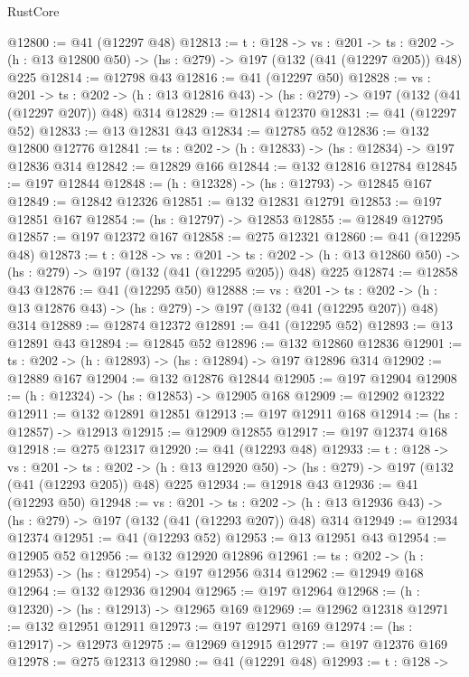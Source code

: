 \begin{lexlean}{RustCore}
\begin{coremodule}
@12800 := @41 (@12297 @48)
@12813 := {t : @128} ->
  {vs : @201} ->
  {ts : @202} -> (h : @13 @12800 @50) -> (hs : @279) -> @197 (@132 (@41 (@12297 @205)) @48) @225
@12814 := @12798 @43
@12816 := @41 (@12297 @50)
@12828 := {vs : @201} ->
  {ts : @202} -> (h : @13 @12816 @43) -> (hs : @279) -> @197 (@132 (@41 (@12297 @207)) @48) @314
@12829 := @12814 @12370
@12831 := @41 (@12297 @52)
@12833 := @13 @12831 @43
@12834 := @12785 @52
@12836 := @132 @12800 @12776
@12841 := {ts : @202} -> (h : @12833) -> (hs : @12834) -> @197 @12836 @314
@12842 := @12829 @166
@12844 := @132 @12816 @12784
@12845 := @197 @12844
@12848 := (h : @12328) -> (hs : @12793) -> @12845 @167
@12849 := @12842 @12326
@12851 := @132 @12831 @12791
@12853 := @197 @12851 @167
@12854 := (hs : @12797) -> @12853
@12855 := @12849 @12795
@12857 := @197 @12372 @167
@12858 := @275 @12321
@12860 := @41 (@12295 @48)
@12873 := {t : @128} ->
  {vs : @201} ->
  {ts : @202} -> (h : @13 @12860 @50) -> (hs : @279) -> @197 (@132 (@41 (@12295 @205)) @48) @225
@12874 := @12858 @43
@12876 := @41 (@12295 @50)
@12888 := {vs : @201} ->
  {ts : @202} -> (h : @13 @12876 @43) -> (hs : @279) -> @197 (@132 (@41 (@12295 @207)) @48) @314
@12889 := @12874 @12372
@12891 := @41 (@12295 @52)
@12893 := @13 @12891 @43
@12894 := @12845 @52
@12896 := @132 @12860 @12836
@12901 := {ts : @202} -> (h : @12893) -> (hs : @12894) -> @197 @12896 @314
@12902 := @12889 @167
@12904 := @132 @12876 @12844
@12905 := @197 @12904
@12908 := (h : @12324) -> (hs : @12853) -> @12905 @168
@12909 := @12902 @12322
@12911 := @132 @12891 @12851
@12913 := @197 @12911 @168
@12914 := (hs : @12857) -> @12913
@12915 := @12909 @12855
@12917 := @197 @12374 @168
@12918 := @275 @12317
@12920 := @41 (@12293 @48)
@12933 := {t : @128} ->
  {vs : @201} ->
  {ts : @202} -> (h : @13 @12920 @50) -> (hs : @279) -> @197 (@132 (@41 (@12293 @205)) @48) @225
@12934 := @12918 @43
@12936 := @41 (@12293 @50)
@12948 := {vs : @201} ->
  {ts : @202} -> (h : @13 @12936 @43) -> (hs : @279) -> @197 (@132 (@41 (@12293 @207)) @48) @314
@12949 := @12934 @12374
@12951 := @41 (@12293 @52)
@12953 := @13 @12951 @43
@12954 := @12905 @52
@12956 := @132 @12920 @12896
@12961 := {ts : @202} -> (h : @12953) -> (hs : @12954) -> @197 @12956 @314
@12962 := @12949 @168
@12964 := @132 @12936 @12904
@12965 := @197 @12964
@12968 := (h : @12320) -> (hs : @12913) -> @12965 @169
@12969 := @12962 @12318
@12971 := @132 @12951 @12911
@12973 := @197 @12971 @169
@12974 := (hs : @12917) -> @12973
@12975 := @12969 @12915
@12977 := @197 @12376 @169
@12978 := @275 @12313
@12980 := @41 (@12291 @48)
@12993 := {t : @128} ->

\end{coremodule}
\end{lexlean}
